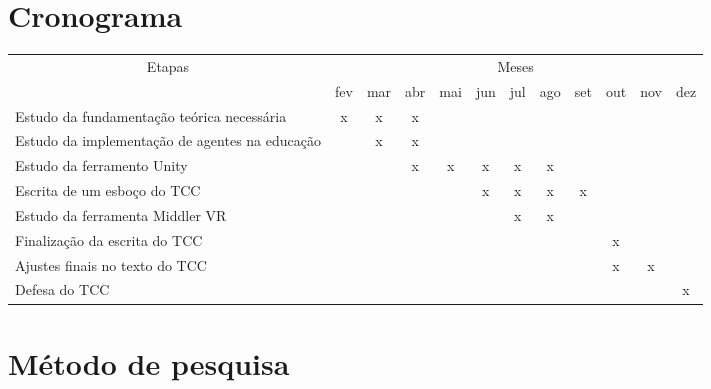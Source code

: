 \documentclass[12pt]{article}
\begin{document}
\newpage
\section{Cronograma}

   \begin{tabularx}{\linewidth}{|X|*{11}{c|}}
        \hline
        \multicolumn{1}{|c|}{\multirow{2}{*}{Etapas}} & \multicolumn{11}{|c|}{Meses}\\ \cline{2-12}
        & fev & mar & abr & mai & jun & jul & ago & set & out & nov & dez   \\ \hline

        Estudo da fundamentação teórica necessária
        &  x  &  x  &  x   &     &      &      &      &      &      &     &      \\ \hline

        Estudo da implementação de agentes na educação
        &     &  x  &  x  &     &      &      &      &      &      &     &     \\ \hline

        Estudo da ferramento Unity               
        &     &    &  x  &  x  &  x  &  x  &  x   &     &     &     &   \\ \hline

        Escrita de um esboço do TCC
        &     &     &     &     &  x & x  &  x  &   x   &    &    &     \\ \hline

       Estudo da ferramenta Middler VR
        &     &    &     &     &     &  x   &  x   &   &    &     &      \\ \hline

        Finalização da escrita do TCC
        &     &    &     &     &     &     &     &    &   x  &     &     \\ \hline

        Ajustes finais no texto do TCC
         &     &    &     &     &     &     &     &    &    x  &  x  &   \\ \hline

        Defesa do TCC
        &   &   &   &   &   &   &  &  &   &   &  x  \\ \hline

    \end{tabularx}
\newpage
\section{Método de pesquisa}
\end{document}
